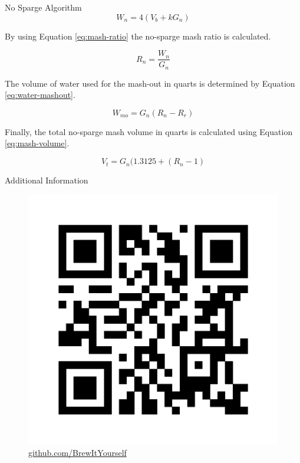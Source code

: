 \documentclass[final]{beamer}
\newlength{\onecolwid}
\begin{document}
\begin{frame}[t]
\begin{columns}[t]
\begin{column}{\onecolwid}
\begin{block}{No Sparge Algorithm}
\begin{equation}
W_{n} = 4(V_{b} + kG_{n})
\label{eq:water-volume}
\end{equation}

\noindent By using Equation \ref{eq:mash-ratio} the no-sparge mash ratio is calculated.

\begin{equation}
R_{n} = \frac{W_{n}}{G_{n}}
\label{eq:mash-ratio}
\end{equation}

\noindent The volume of water used for the mash-out in quarts is determined by Equation \ref{eq:water-mashout}.

\begin{equation}
W_{mo} = G_{n}(R_{n} - R_{r})
\label{eq:water-mashout}
\end{equation}

\noindent Finally, the total no-sparge mash volume in quarts is calculated using Equation \ref{eq:mash-volume}.

\begin{equation}
V_{t} = G_{n}(1.3125 + (R_{n} - 1)
\label{eq:mash-volume}
\end{equation}

\end{block}


\begin{alertblock}{Additional Information}

\begin{figure}
\includegraphics[width=0.4\linewidth]{qr-biy.png}
\caption{\href{https://github.com/BrewItYourself}{github.com/BrewItYourself}}
\end{figure}

\end{alertblock}


\end{column}
\end{columns}
\end{frame}
\end{document}
